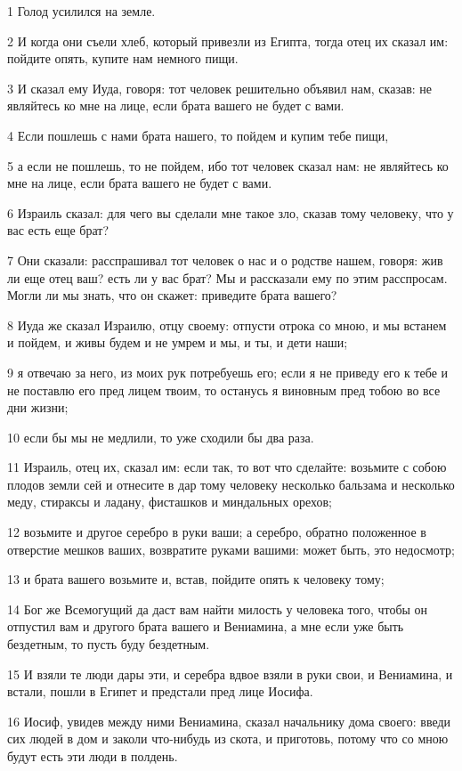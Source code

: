 \par 1 Голод усилился на земле.
\par 2 И когда они съели хлеб, который привезли из Египта, тогда отец их сказал им: пойдите опять, купите нам немного пищи.
\par 3 И сказал ему Иуда, говоря: тот человек решительно объявил нам, сказав: не являйтесь ко мне на лице, если брата вашего не будет с вами.
\par 4 Если пошлешь с нами брата нашего, то пойдем и купим тебе пищи,
\par 5 а если не пошлешь, то не пойдем, ибо тот человек сказал нам: не являйтесь ко мне на лице, если брата вашего не будет с вами.
\par 6 Израиль сказал: для чего вы сделали мне такое зло, сказав тому человеку, что у вас есть еще брат?
\par 7 Они сказали: расспрашивал тот человек о нас и о родстве нашем, говоря: жив ли еще отец ваш? есть ли у вас брат? Мы и рассказали ему по этим расспросам. Могли ли мы знать, что он скажет: приведите брата вашего?
\par 8 Иуда же сказал Израилю, отцу своему: отпусти отрока со мною, и мы встанем и пойдем, и живы будем и не умрем и мы, и ты, и дети наши;
\par 9 я отвечаю за него, из моих рук потребуешь его; если я не приведу его к тебе и не поставлю его пред лицем твоим, то останусь я виновным пред тобою во все дни жизни;
\par 10 если бы мы не медлили, то уже сходили бы два раза.
\par 11 Израиль, отец их, сказал им: если так, то вот что сделайте: возьмите с собою плодов земли сей и отнесите в дар тому человеку несколько бальзама и несколько меду, стираксы и ладану, фисташков и миндальных орехов;
\par 12 возьмите и другое серебро в руки ваши; а серебро, обратно положенное в отверстие мешков ваших, возвратите руками вашими: может быть, это недосмотр;
\par 13 и брата вашего возьмите и, встав, пойдите опять к человеку тому;
\par 14 Бог же Всемогущий да даст вам найти милость у человека того, чтобы он отпустил вам и другого брата вашего и Вениамина, а мне если уже быть бездетным, то пусть буду бездетным.
\par 15 И взяли те люди дары эти, и серебра вдвое взяли в руки свои, и Вениамина, и встали, пошли в Египет и предстали пред лице Иосифа.
\par 16 Иосиф, увидев между ними Вениамина, сказал начальнику дома своего: введи сих людей в дом и заколи что-нибудь из скота, и приготовь, потому что со мною будут есть эти люди в полдень.
